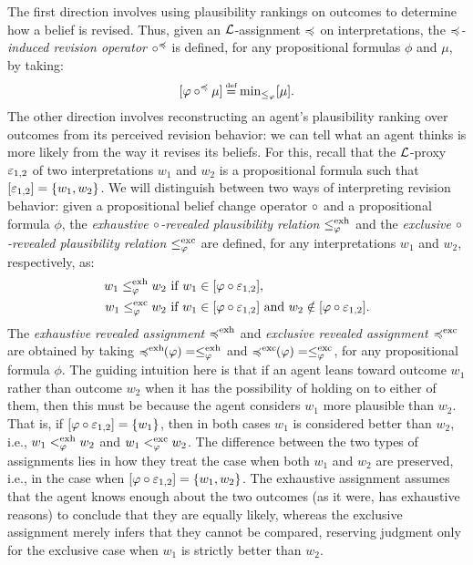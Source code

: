The first direction involves using plausibility rankings 
on outcomes to determine how a belief is revised.
Thus, given an $\mathcal{L}$-assignment $\preccurlyeq$ on interpretations, 
the \emph{$\preccurlyeq$-induced revision operator $\circ^\preccurlyeq$} is defined,
for any propositional formulas $\phi$ and $\mu$, 
by taking:
$$
	[\phi\re^\as\mu]\defeq\min_{\le_\phi}[\mu].
$$
The other direction involves reconstructing an agent's plausibility 
ranking over outcomes from its perceived revision behavior:
we can tell what an agent thinks is more likely from the way it
revises its beliefs.
For this, recall that the $\mathcal{L}$-proxy $\varepsilon_{1,2}$ of two interpretations $w_1$ and $w_2$
is a propositional formula such that $[\varepsilon_{1,2}]=\{w_1,w_2\}$.
We will distinguish between two ways of interpreting revision behavior:
given a propositional belief change operator $\circ$ and a propositional formula $\phi$,
the \emph{exhaustive $\circ$-revealed plausibility relation $\le^{\operatorname{exh}}_\varphi$} 
and the \emph{exclusive $\circ$-revealed plausibility relation $\le^{\operatorname{exc}}_\varphi$} 
are defined, for any interpretations $w_1$ and $w_2$, respectively, as:
\begin{align*}
	w_1\le^{\operatorname{exh}}_\varphi w_2 &~\text{if}~w_1\in[\varphi\circ\varepsilon_{1,2}],\\
	w_1\le^{\operatorname{exc}}_\varphi w_2 &~\text{if}~w_1\in[\varphi\circ\varepsilon_{1,2}]~\text{and}~w_2\notin[\varphi\circ\varepsilon_{1,2}].
\end{align*}
The \emph{exhaustive revealed assignment $\preccurlyeq^{\operatorname{exh}}$} 
and \emph{exclusive revealed assignment $\preccurlyeq^{\operatorname{exc}}$} are obtained
by taking $\preccurlyeq^{\operatorname{exh}}\!\!(\varphi)=\le^{\operatorname{exh}}_\varphi$ and $\preccurlyeq^{\operatorname{exc}}\!\!(\varphi)=\le^{\operatorname{exc}}_\varphi$, 
for any propositional formula $\phi$.
The guiding intuition here is that if an agent leans toward 
outcome $w_1$ rather than outcome $w_2$ when it has 
the possibility of holding on to either of them, 
then this must be because the agent considers $w_1$ 
more plausible than $w_2$.
That is, if $[\varphi\circ\varepsilon_{1,2}]=\{w_1\}$,
then in both cases $w_1$ is considered better than $w_2$,
i.e.,
$w_1<^{{\operatorname{exh}}}_{\varphi} w_2$ and $w_1<^{{\operatorname{exc}}}_{\varphi} w_2$.
The difference between the two types of assignments 
lies in how they treat the case when both $w_1$ and $w_2$ are preserved,
i.e., in the case when $[\varphi\circ\varepsilon_{1,2}]=\{w_1,w_2\}$.
The exhaustive assignment assumes that the agent knows 
enough about the two outcomes
(as it were, has exhaustive reasons) 
to conclude that they are equally likely, 
whereas the exclusive assignment merely infers 
that they cannot be compared,
reserving judgment only for the exclusive case when
$w_1$ is strictly better than $w_2$.

